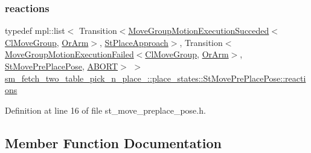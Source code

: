 \subsubsection{\texorpdfstring{reactions}{reactions}}
{\footnotesize\ttfamily typedef mpl\+::list$<$ Transition$<$\hyperlink{structcl__move__group__interface_1_1MoveGroupMotionExecutionSucceded}{Move\+Group\+Motion\+Execution\+Succeded}$<$\hyperlink{classcl__move__group__interface_1_1ClMoveGroup}{Cl\+Move\+Group}, \hyperlink{classsm__fetch__two__table__pick__n__place__1_1_1OrArm}{Or\+Arm}$>$, \hyperlink{structsm__fetch__two__table__pick__n__place__1_1_1place__states_1_1StPlaceApproach}{St\+Place\+Approach}$>$, Transition$<$\hyperlink{structcl__move__group__interface_1_1MoveGroupMotionExecutionFailed}{Move\+Group\+Motion\+Execution\+Failed}$<$\hyperlink{classcl__move__group__interface_1_1ClMoveGroup}{Cl\+Move\+Group}, \hyperlink{classsm__fetch__two__table__pick__n__place__1_1_1OrArm}{Or\+Arm}$>$, \hyperlink{structsm__fetch__two__table__pick__n__place__1_1_1place__states_1_1StMovePrePlacePose}{St\+Move\+Pre\+Place\+Pose}, \hyperlink{classABORT}{A\+B\+O\+RT}$>$ $>$ \hyperlink{structsm__fetch__two__table__pick__n__place__1_1_1place__states_1_1StMovePrePlacePose_a2a4985599c9940dae301751fd67a2bf0}{sm\+\_\+fetch\+\_\+two\+\_\+table\+\_\+pick\+\_\+n\+\_\+place\+\_\+::place\+\_\+states\+::\+St\+Move\+Pre\+Place\+Pose\+::reactions}}



Definition at line 16 of file st\+\_\+move\+\_\+preplace\+\_\+pose.\+h.



\subsection{Member Function Documentation}
\mbox{\label{structsm__fetch__two__table__pick__n__place__1_1_1place__states_1_1StMovePrePlacePose_a1d91676007b18e4e5d3f763cba7d51b9}} 
